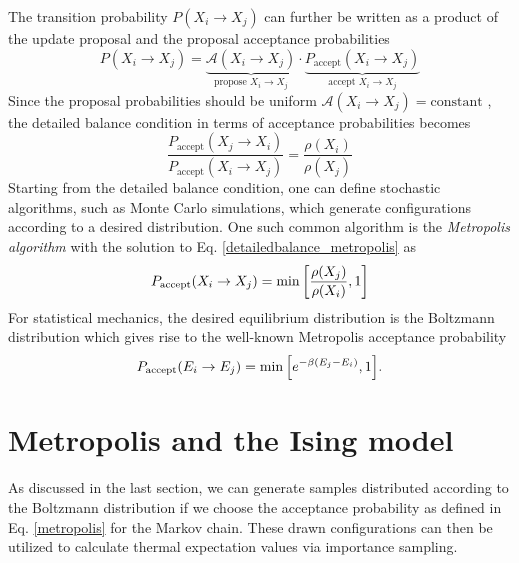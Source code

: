 \documentclass[../thesis_main.tex]{subfiles}
\begin{document}
The transition probability $P(X_i \to X_j)$ can further be written as a product of the update proposal and the proposal acceptance probabilities 
\begin{equation}
    P(X_i \to X_j) = \underbrace{\mathcal{A}(X_i \to X_j)}_{\text{propose }X_i \to X_j} \cdot \underbrace{P_\text{accept}(X_i \to X_j)}_{\text{accept }X_i \to X_j}
\end{equation}
Since the proposal probabilities should be uniform $\mathcal{A}(X_i \to X_j) = \text{constant}$ , the detailed balance condition in terms of acceptance probabilities becomes 
\begin{equation}
    \frac{P_\text{accept}(X_j \to X_i)}{P_\text{accept} (X_i \to X_j)} = \frac{\rho(X_i)}{\rho(X_j)}
    \label{detailedbalance_metropolis}
\end{equation}
Starting from the detailed balance condition, one can define stochastic algorithms, such as Monte Carlo simulations, which generate configurations according to a desired distribution. One such common algorithm is the \textit{Metropolis algorithm} with the solution to Eq. \eqref{detailedbalance_metropolis} as 
\begin{equation}
    P_\text{accept}(X_i \to X_j) = \min \qty[\frac{\rho(X_j)}{\rho(X_i)}, 1]
\end{equation}
For statistical mechanics, the desired equilibrium distribution is the Boltzmann distribution which gives rise to the well-known Metropolis acceptance probability
\begin{equation}
    P_\text{accept}(E_i \to E_j) = \min \qty[e^{-\beta(E_j - E_i)}, 1]. 
    \label{metropolis}
\end{equation}

\section{Metropolis and the Ising model}
As discussed in the last section, we can generate samples distributed according to the Boltzmann distribution if we choose the acceptance probability as defined in Eq. \eqref{metropolis} for the Markov chain. These drawn configurations can then be utilized to calculate thermal expectation values via importance sampling.
\end{document}
